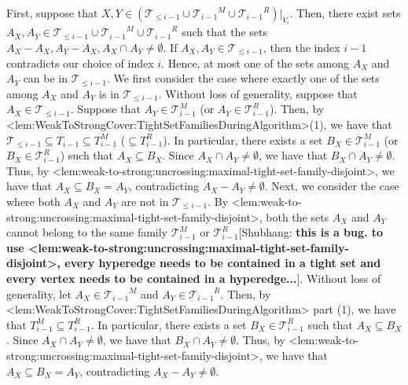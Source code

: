 \documentclass{article}
\def\Cref#1{<#1>}%
\newcommand{\maximalTightSetFamily}[1]{\ensuremath{\calT_{#1}}\xspace}
\newcommand{\tightSetFamily}[1]{\ensuremath{T_{#1}}\xspace}
\newcommand{\cumulativeMaximalTightSetFamily}[1]{\ensuremath{\calT_{\leq #1}}}
\newcommand{\projCumulativeMaximalTightSetFamily}[2]{\ensuremath{\calT_{\leq #1}|_{V_{#2}}}}
\newcommand{\maximalTightSetFamilyAfterMerge}[1]{\ensuremath{\calT_{#1}^M}\xspace}
\newcommand{\maximalTightSetFamilyAfterReduce}[1]{\ensuremath{\calT_{#1}^R}\xspace}
\newcommand{\tightSetFamilyAfterMerge}[1]{\ensuremath{T_{#1}^M}\xspace}
\newcommand{\tightSetFamilyAfterReduce}[1]{\ensuremath{T_{#1}^R}\xspace}
\newcommand{\shubhang}[1]{{\color{blue}[{\tiny Shubhang: \bf #1}]\marginpar{\color{blue}*}}}
\providecommand{\calT}{\mathcal{T}}
\begin{document}
        First, suppose that $X, Y \in \left(\cumulativeMaximalTightSetFamily{i-1} \cup \maximalTightSetFamily{i-1}^M \cup \maximalTightSetFamily{i-1}^R\right)|_{V_i}$. Then, there exist sets $A_X, A_Y \in \cumulativeMaximalTightSetFamily{i-1} \cup \maximalTightSetFamily{i-1}^M \cup \maximalTightSetFamily{i-1}^R$ such that the sets $A_X-A_X, A_Y-A_X, A_X\cap A_Y\neq \emptyset$. If $A_X, A_Y \in \cumulativeMaximalTightSetFamily{{i-1}}$, then the index $i-1$ contradicts our choice of index $i$. Hence, at most one of the sets among $A_X$ and $A_Y$ can be in $\cumulativeMaximalTightSetFamily{{i-1}}$. 
        We first consider the case where exactly one of the sets among $A_X$ and $A_Y$ is in $\cumulativeMaximalTightSetFamily{{i-1}}$. Without loss of generality, suppose that $A_X \in \cumulativeMaximalTightSetFamily{i-1}$. Suppose that $A_Y \in \maximalTightSetFamilyAfterMerge{i-1}$ (or $A_Y\in \maximalTightSetFamilyAfterReduce{i-1}$). Then, by \Cref{lem:WeakToStrongCover:TightSetFamiliesDuringAlgorithm}(1), we have that $\cumulativeMaximalTightSetFamily{i-1} \subseteq \tightSetFamily{i-1} \subseteq \tightSetFamilyAfterMerge{i-1}$ ($\subseteq \tightSetFamilyAfterReduce{i-1}$). In particular, there exists a set $B_X \in \maximalTightSetFamilyAfterMerge{i-1}$ (or $B_X \in \maximalTightSetFamilyAfterReduce{i-1}$) such that $A_X\subseteq B_X$. Since $A_X \cap A_Y \not = \emptyset$, we have that $B_X \cap A_Y \not = \emptyset$. Thus, by \Cref{lem:weak-to-strong:uncrossing:maximal-tight-set-family-disjoint}, we have that $A_X \subseteq B_X = A_Y$, contradicting $A_X-A_Y\neq \emptyset$. 
        Next, we consider the case where both $A_X$ and $A_Y$ are not in $\cumulativeMaximalTightSetFamily{{i-1}}$. By \Cref{lem:weak-to-strong:uncrossing:maximal-tight-set-family-disjoint}, both the sets $A_X$ and $A_Y$ cannot belong to the same family $\maximalTightSetFamilyAfterMerge{i-1}$ or $\maximalTightSetFamilyAfterReduce{i-1}$\shubhang{this is a bug. to use \Cref{lem:weak-to-strong:uncrossing:maximal-tight-set-family-disjoint}, every hyperedge needs to be contained in a tight set and every vertex needs to be contained in a hyperedge...}. Without loss of generality, let $A_X\in \maximalTightSetFamily{i-1}^M $ and $A_Y\in \maximalTightSetFamily{i-1}^R$. Then, by \Cref{lem:WeakToStrongCover:TightSetFamiliesDuringAlgorithm} part (1), we have that $\tightSetFamilyAfterMerge{i-1}\subseteq \tightSetFamilyAfterReduce{i-1}$. In particular, there exists a set $B_X \in \maximalTightSetFamilyAfterReduce{i-1}$ such that $A_X\subseteq B_X$. Since $A_X \cap A_Y \not = \emptyset$, we have that $B_X \cap A_Y \not = \emptyset$. Thus, by \Cref{lem:weak-to-strong:uncrossing:maximal-tight-set-family-disjoint}, we have that $A_X \subseteq B_X = A_Y$, contradicting $A_X-A_Y\neq \emptyset$. 
        
\end{document}
